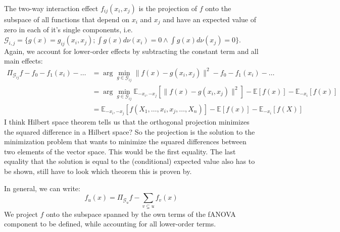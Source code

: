 The two-way interaction effect $f_{ij}(x_i,x_j)$ is the projection of $f$ onto the subspace of all functions that depend on $x_i$ and $x_j$ and have an expected value of zero in each of it's single components, i.e. $\mathcal{G}_{i,j} = \{g(x) = g_{ij}(x_i, x_j); \int g(x) d\nu (x_i) = 0 \land \int g(x) d\nu (x_j) = 0\}$. Again, we account for lower-order effects by subtracting the constant term and all main effects:
\begin{align*}
    \Pi_{\mathcal{G}_{ij}}f - f_0 - f_1(x_i) - \dots
    &= \arg \min_{g \in \mathcal{G}_{ij}} \|f(x) - g(x_i, x_j)\|^2 - f_0 - f_1(x_i) - \dots \\
    &= \arg \min_{g \in \mathcal{G}_{ij}} \mathbb{E}_{-x_i, -x_j}[\|f(x) - g(x_i, x_j)\|^2] - \mathbb{E}[f(x)] - \mathbb{E}_{-x_i}[f(x)]\\
    &= \mathbb{E}_{-x_i, -x_j}[f(X_1, \dots, x_i, x_j, \dots, X_n)] - \mathbb{E}[f(x)] - \mathbb{E}_{-x_i}[f(X)]
\end{align*}
{\color{blue}I think Hilbert space theorem tells us that the orthogonal projection minimizes the squared difference in a Hilbert space?
So the projection is the solution to the minimization problem that wants to minimize the squared differences between two elements of the vector space.
This would be the first equality. The last equality that the solution is equal to the (conditional) expected value also has to be shown, still have to look which theorem this is proven by.}

In general, we can write:
\begin{equation}
    f_u(x) = \Pi_{\mathcal{G}_u}f - \sum_{v \subsetneq u} f_v(x)
\end{equation}
We project $f$ onto the subspace spanned by the own terms of the fANOVA component to be defined, while accounting for all lower-order terms.




